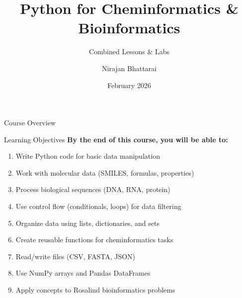 \documentclass{beamer}
\title{Python for Cheminformatics \& Bioinformatics}
\subtitle{Combined Lessons \& Labs}
\author{Nirajan Bhattarai}
\institute{AI-Driven Drug Development Training}
\date{February 2026}
\begin{document}
\begin{frame}
    \titlepage
\end{frame}

\begin{frame}{Course Overview}
    \tableofcontents
\end{frame}

\begin{frame}{Learning Objectives}
    \footnotesize
    \textbf{By the end of this course, you will be able to:}
    \vspace{0.3em}
    \begin{enumerate}
        \item Write Python code for basic data manipulation
        \item Work with molecular data (SMILES, formulas, properties)
        \item Process biological sequences (DNA, RNA, protein)
        \item Use control flow (conditionals, loops) for data filtering
        \item Organize data using lists, dictionaries, and sets
        \item Create reusable functions for cheminformatics tasks
        \item Read/write files (CSV, FASTA, JSON)
        \item Use NumPy arrays and Pandas DataFrames
        \item Apply concepts to Rosalind bioinformatics problems
    \end{enumerate}
\end{frame}
\end{document}
